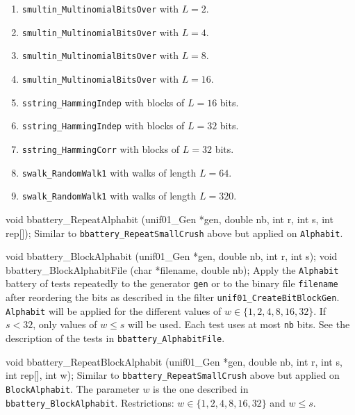 \begin{enumerate}
  \item {\tt smultin\_MultinomialBitsOver} with $L=2$.
  \item {\tt smultin\_MultinomialBitsOver} with $L=4$.
  \item {\tt smultin\_MultinomialBitsOver} with $L=8$.
  \item {\tt smultin\_MultinomialBitsOver} with $L=16$.
  \item {\tt sstring\_HammingIndep} with blocks of $L = 16$ bits.
  \item {\tt sstring\_HammingIndep} with blocks of $L = 32$ bits.
  \item {\tt sstring\_HammingCorr} with blocks of $L = 32$ bits.
  \item {\tt swalk\_RandomWalk1} with walks of length $L = 64$.
  \item {\tt swalk\_RandomWalk1} with walks of length $L = 320$.
\end{enumerate}

\code

void bbattery_RepeatAlphabit (unif01_Gen *gen, double nb, int r, int s,
                              int rep[]);
\endcode
  \tab Similar to {\tt bbattery\_RepeatSmallCrush} above but applied on
  {\tt Alphabit}.
  \endtab
\code


void bbattery_BlockAlphabit (unif01_Gen *gen, double nb, int r, int s);
void bbattery_BlockAlphabitFile (char *filename, double nb);
\endcode
 \tab Apply the {\tt Alphabit} battery of tests repeatedly to the generator
  {\tt gen} or to the binary file {\tt filename} after reordering the bits
  as described in the filter {\tt unif01\_CreateBitBlockGen}.
  {\tt Alphabit} will be applied for the different values of
   $w \in \{1, 2, 4, 8, 16, 32\}$. If $s <32$, only values of $w \le s$ will
   be used. Each test uses at most {\tt nb} bits.
   See the description of the tests in {\tt bbattery\_AlphabitFile}.
  \endtab
\code


void bbattery_RepeatBlockAlphabit (unif01_Gen *gen, double nb, int r, int s,
                                   int rep[], int w);
\endcode
  \tab Similar to {\tt bbattery\_RepeatSmallCrush} above but applied on
   {\tt BlockAlphabit}. The parameter $w$ is the one described in
    {\tt bbattery\_BlockAlphabit}.  Restrictions:
   $w \in \{1, 2, 4, 8, 16, 32\}$ and $w \le s$.
  \endtab




\code



